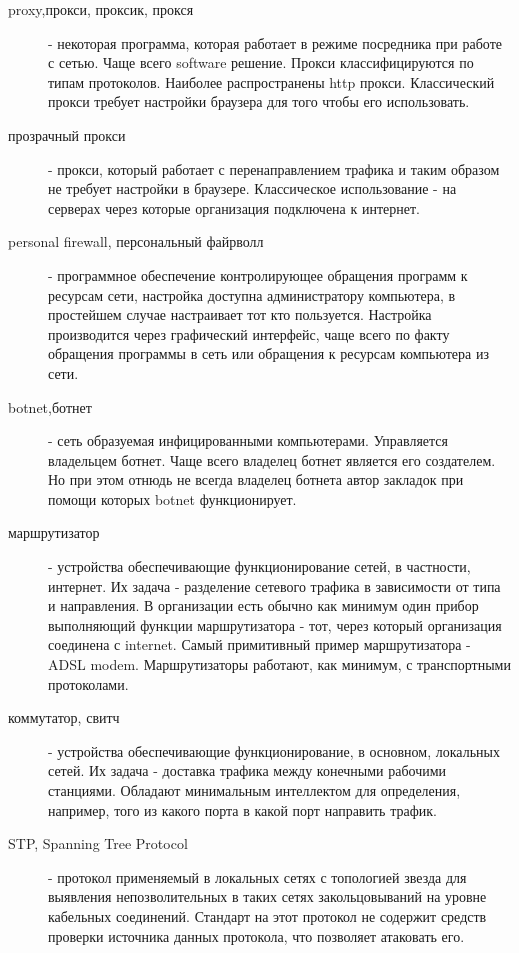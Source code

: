 \begin{description}
\item[proxy,прокси, проксик, прокся]
 - некоторая программа, которая работает в режиме посредника при работе с сетью.
Чаще всего software решение. Прокси классифицируются по типам протоколов.
Наиболее распространены http прокси. Классический прокси требует настройки
браузера для того чтобы его использовать.

\item[прозрачный прокси]
 - прокси, который работает с перенаправлением трафика и таким образом не требует
 настройки в браузере. Классическое использование - на серверах через которые
 организация подключена к интернет.

\item[personal firewall, персональный файрволл]
 - программное обеспечение контролирующее обращения программ к ресурсам сети,
 настройка доступна администратору компьютера, в простейшем случае настраивает
 тот кто пользуется. Настройка производится через графический интерфейс, чаще
 всего по факту обращения программы в сеть или обращения к ресурсам компьютера из сети.

\item[botnet,ботнет]
 - сеть образуемая инфицированными компьютерами. Управляется владельцем ботнет.
Чаще всего владелец ботнет является его создателем. Но при этом отнюдь не
всегда владелец ботнета автор закладок при помощи которых botnet функционирует.

\item[маршрутизатор]
 - устройства обеспечивающие функционирование сетей, в частности, интернет. Их
задача - разделение сетевого трафика в зависимости от типа и направления. В
организации есть обычно как минимум один прибор выполняющий функции маршрутизатора - тот,
 через который организация соединена с internet. Самый примитивный пример маршрутизатора - ADSL modem.
 Маршрутизаторы работают, как минимум, с транспортными протоколами.

\item[коммутатор, свитч]
 - устройства обеспечивающие функционирование, в основном, локальных сетей. Их задача - доставка трафика между конечными рабочими станциями. Обладают минимальным интеллектом для определения, например, того из какого порта в какой порт направить трафик.

\item[STP, Spanning Tree Protocol]
- протокол применяемый в локальных сетях с топологией звезда для выявления
 непозволительных в таких
сетях закольцовываний на уровне кабельных соединений. Стандарт на этот протокол
не содержит средств проверки источника данных протокола, что позволяет атаковать
его.



\end{description}
